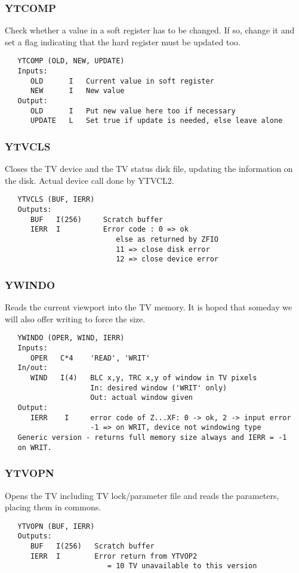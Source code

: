 \subsubsection{YTCOMP}
Check whether a value in a soft register has to be changed.  If so,
change it and set a flag indicating that the hard register must be
updated too.
\begin{verbatim}
   YTCOMP (OLD, NEW, UPDATE)
   Inputs:
      OLD      I   Current value in soft register
      NEW      I   New value
   Output:
      OLD      I   Put new value here too if necessary
      UPDATE   L   Set true if update is needed, else leave alone

\end{verbatim}

\subsubsection{YTVCLS}
Closes the TV device and the TV status disk file, updating
the information on the disk.  Actual device call done by YTVCL2.
\begin{verbatim}
   YTVCLS (BUF, IERR)
   Outputs:
      BUF   I(256)     Scratch buffer
      IERR  I          Error code : 0 => ok
                          else as returned by ZFIO
                          11 => close disk error
                          12 => close device error

\end{verbatim}

\subsubsection{YWINDO}
Reads the current viewport into the TV memory.  It is hoped
that someday we will also offer writing to force the size.
\begin{verbatim}
   YWINDO (OPER, WIND, IERR)
   Inputs:
      OPER   C*4    'READ', 'WRIT'
   In/out:
      WIND   I(4)   BLC x,y, TRC x,y of window in TV pixels
                    In: desired window ('WRIT' only)
                    Out: actual window given
   Output:
      IERR    I     error code of Z...XF: 0 -> ok, 2 -> input error
                    -1 => on WRIT, device not windowing type
   Generic version - returns full memory size always and IERR = -1
   on WRIT.

\end{verbatim}


\subsubsection{YTVOPN}
Opens the TV including TV lock/parameter file and reads the
parameters, placing them in commons.
\begin{verbatim}
   YTVOPN (BUF, IERR)
   Outputs:
      BUF   I(256)   Scratch buffer
      IERR  I        Error return from YTVOP2
                        = 10 TV unavailable to this version

\end{verbatim}




